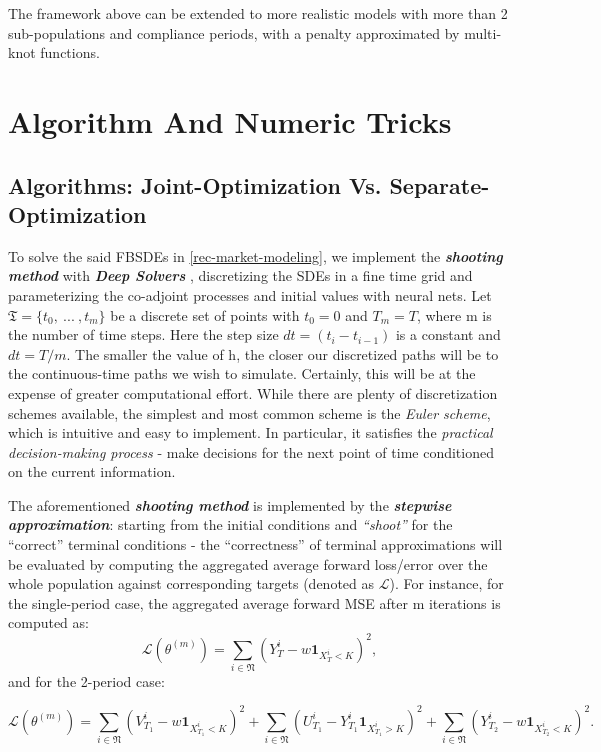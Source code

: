 \documentclass[a4paper,10pt]{article}
\newcommand{\1}{\mathbf{1}}
\begin{document}
The framework above can be extended to more realistic models with more
than 2 sub-populations and compliance periods, with a penalty approximated
by multi-knot functions.

\section{Algorithm And Numeric
Tricks}

\subsection{Algorithms: Joint-Optimization Vs.
Separate-Optimization}

To solve the said FBSDEs in \ref{rec-market-modeling}, we
implement the \textbf{\emph{shooting method}} with \emph{\textbf{Deep Solvers}}
\cite{JH}, discretizing the SDEs in a fine time grid and parameterizing the
co-adjoint processes and initial values with neural nets. Let
\(\mathfrak{T}=\lbrace{t_0,~...~, t_m \rbrace}\) be a discrete set of
points with \(t_0=0\) and \(T_m=T\), where m is the number of time
steps. Here the step size \(dt=(t_i-t_{i-1})\) is a constant and
\(dt=T/m\). The smaller the value of h, the closer our discretized paths
will be to the continuous-time paths we wish to simulate. Certainly,
this will be at the expense of greater computational effort. While there
are plenty of discretization schemes available, the simplest and most
common scheme is the \emph{Euler scheme}, which is intuitive and easy to
implement. In particular, it satisfies the \emph{practical
decision-making process} - make decisions for the next point of time
conditioned on the current information.

The aforementioned \textbf{\emph{shooting method}} is implemented by the
\textbf{\textit{stepwise approximation}}: starting from the initial conditions and
\emph{``shoot''} for the ``correct'' terminal conditions - the
``correctness'' of terminal approximations will be evaluated by
computing the aggregated average forward loss/error over the whole
population against corresponding targets (denoted as \(\mathcal{L}\)).
For instance, for the single-period case, the aggregated average forward
MSE after m iterations is computed as: \[
\mathcal{L}(\theta^{(m)})= \sum_{i\in\mathfrak{N}}(Y_{T}^i-w\mathbf{1}_{X_{T}^i<K})^2,
\] and for the 2-period case:

\[
\mathcal{L}(\theta^{(m)})= \sum_{i\in\mathfrak{N}}(V_{T_1}^i-w\mathbf{1}_{X_{T_1}^i<K})^2 + \sum_{i\in\mathfrak{N}}(U_{T_1}^i-Y_{T_1}^i\mathbf{1}_{X_{T_1}^i>K})^2 + \sum_{i\in\mathfrak{N}}(Y_{T_2}^i-w\mathbf{1}_{X_{T_2}^i<K})^2.
\]
\end{document}
